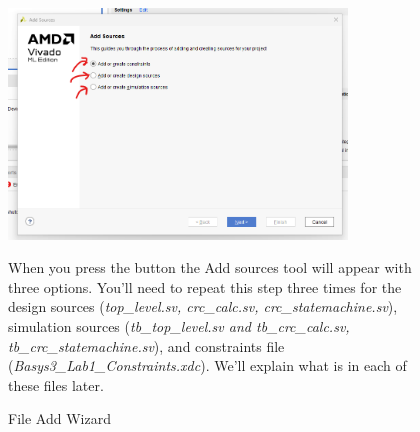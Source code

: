     \begin{figure}[H]
        \centering
        \includegraphics[width=9cm]{Images/CreateBitstreamImages/Vivado_AddSources_Page1.png}
        \caption{File Add Wizard}
        \label{fig:enter-label}
        \raggedright
        \vspace{0.5cm}
            When you press the button the Add sources tool will appear with three options.
    You'll need to repeat this step three times for the design sources (\textit{top\_level.sv, crc\_calc.sv, crc\_statemachine.sv}), simulation sources (\textit{tb\_top\_level.sv and tb\_crc\_calc.sv, tb\_crc\_statemachine.sv}), and constraints file (\textit{Basys3\_Lab1\_Constraints.xdc}). We'll explain what is in each of these files later.

    \end{figure}

